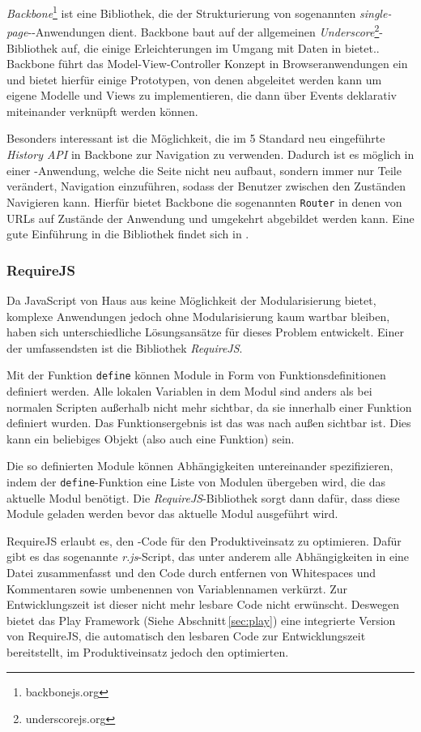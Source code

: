\textit{Backbone}\footnote{backbonejs.org} ist eine Bibliothek, die der Strukturierung von
sogenannten \textit{single-page}--Anwendungen dient. Backbone baut auf der allgemeinen
\textit{Underscore}\footnote{underscorejs.org}-Bibliothek auf, die einige Erleichterungen im Umgang
mit Daten in  bietet.. Backbone führt das Model-View-Controller Konzept in
Browseranwendungen ein und bietet hierfür einige Prototypen, von denen abgeleitet werden kann um
eigene Modelle und Views zu implementieren, die dann über Events deklarativ miteinander verknüpft
werden können.

Besonders interessant ist die Möglichkeit, die im 5 Standard neu eingeführte
\textit{History API} in Backbone zur Navigation zu verwenden. Dadurch ist es möglich in einer
-Anwendung, welche die Seite nicht neu aufbaut, sondern immer nur Teile verändert,
Navigation einzuführen, sodass der Benutzer zwischen den Zuständen Navigieren kann. Hierfür bietet
Backbone die sogenannten \texttt{Router} in denen von URLs auf Zustände der Anwendung und umgekehrt
abgebildet werden kann. Eine gute Einführung in die Bibliothek findet sich in \cite{backbone}.

\subsubsection{RequireJS}
\label{sec:requirejs}

Da JavaScript von Haus aus keine Möglichkeit der Modularisierung bietet, komplexe Anwendungen
jedoch ohne Modularisierung kaum wartbar bleiben, haben sich unterschiedliche Lösungsansätze für
dieses Problem entwickelt. Einer der  umfassendsten ist die Bibliothek \textit{RequireJS}.

Mit der Funktion \texttt{define} können Module in Form von Funktionsdefinitionen  definiert werden.
Alle lokalen Variablen in dem Modul sind anders als bei  normalen Scripten außerhalb nicht mehr
sichtbar, da sie innerhalb einer  Funktion definiert wurden. Das Funktionsergebnis ist das was nach
außen sichtbar  ist. Dies kann ein beliebiges Objekt (also auch eine Funktion) sein.

Die so definierten Module können Abhängigkeiten untereinander spezifizieren,  indem der
\texttt{define}-Funktion eine Liste von Modulen übergeben wird, die  das aktuelle Modul benötigt.
Die \textit{RequireJS}-Bibliothek sorgt dann dafür,  dass diese Module geladen werden bevor das
aktuelle Modul ausgeführt wird.

RequireJS erlaubt es, den  -Code für den Produktiveinsatz zu optimieren. Dafür
gibt es  das sogenannte \textit{r.js}-Script, das unter anderem alle Abhängigkeiten in eine Datei
zusammenfasst und den Code durch entfernen von Whitespaces und Kommentaren  sowie umbenennen
von Variablennamen verkürzt. Zur Entwicklungszeit ist dieser nicht mehr lesbare Code nicht
erwünscht. Deswegen bietet das Play Framework (Siehe Abschnitt\,\ref{sec:play}) eine integrierte
Version von RequireJS, die automatisch den lesbaren Code zur Entwicklungszeit  bereitstellt, im
Produktiveinsatz jedoch den optimierten.
